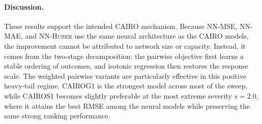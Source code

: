 \paragraph{Discussion.}
These results support the intended CAIRO mechanism. Because \textsc{NN-MSE}, \textsc{NN-MAE}, and \textsc{NN-Huber} use the same neural architecture as the CAIRO models, the improvement cannot be attributed to network size or capacity. Instead, it comes from the two-stage decomposition: the pairwise objective first learns a stable ordering of outcomes, and isotonic regression then restores the response scale. The weighted pairwise variants are particularly effective in this positive heavy-tail regime. \textsc{CAIROG1} is the strongest model across most of the sweep, while \textsc{CAIROS1} becomes slightly preferable at the most extreme severity \(s=2.0\), where it attains the best RMSE among the neural models while preserving the same strong ranking performance.
